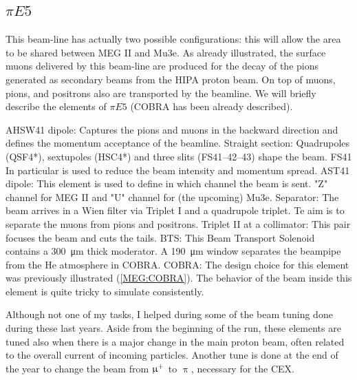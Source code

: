 \begin{refsection}
    \subsection{$\pi E5$}
        This beam-line has actually two possible configurations: this will allow the area to be shared between MEG II and Mu3e. 
        As already illustrated, the surface muons delivered by this beam-line are produced for the decay of the pions generated as secondary beams from the HIPA proton beam.
        On top of muons, pions, and positrons also are transported by the beamline.
        We will briefly describe the elements of $\pi E5$ (COBRA has been already described). 

        \begin{outline}
            \1 AHSW41 dipole: Captures the pions and muons in the backward direction and defines the momentum acceptance of the beamline.
            \1 Straight section: Quadrupoles (QSF4*), sextupoles (HSC4*) and three slits (FS41–42–43) shape the beam. FS41 In particular is used to reduce the beam intensity and momentum spread.
            \1 AST41 dipole: This element is used to define in which channel the beam is sent. "Z" channel for MEG II and "U" channel for (the upcoming) Mu3e.
            \1 Separator: The beam arrives in a Wien filter via Triplet I and a quadrupole triplet. Te aim is to separate the muons from pions and positrons.
            \1 Triplet II at a collimator: This pair focuses the beam and cuts the tails.
            \1 BTS: This Beam Transport Solenoid contains a \SI{300}{\micro m} thick \mylar moderator.
            \1 A \SI{190}{\micro m} \mylar window separates the beampipe from the He atmosphere in COBRA.
            \1 COBRA: The design choice for this element was previously illustrated (\ref{MEG:COBRA}). 
            The behavior of the beam inside this element is quite tricky to simulate consistently.
        \end{outline}

        \noindent
        Although not one of my tasks, I helped during some of the beam tuning done during these last years.
        Aside from the beginning of the run, these elements are tuned also when there is a major change in the main proton beam, often related to the overall current of incoming particles.
        Another tune is done at the end of the year to change the beam from $\upmu^+$ to $\uppi$, necessary for the CEX.
        

\end{refsection}
